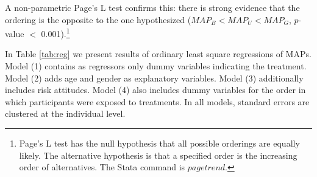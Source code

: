 A non-parametric Page's L test confirms this: there is strong evidence that the ordering is the opposite to the one hypothesized ($MAP_B < MAP_U < MAP_G$, $p$-value $<$ 0.001).\footnote{
Page's L test has the null hypothesis that all possible orderings are equally likely.
The alternative hypothesis is that a specified order is the increasing order of alternatives.
The Stata command is $pagetrend$.
}

In Table \ref{tab:reg} we present results of ordinary least square regressions of MAPs.
Model (1) contains as regressors only dummy variables indicating the treatment.
Model (2) adds age and gender as explanatory variables.
Model (3) additionally includes risk attitudes.
Model (4) also includes dummy variables for the order in which participants were exposed to treatments.
In all models, standard errors are clustered at the individual level.
